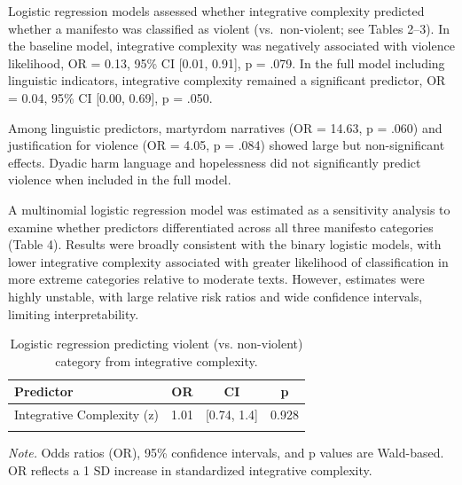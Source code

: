 \documentclass[
  english,
  man,floatsintext]{apa6}
\begin{document}
Logistic regression models assessed whether integrative complexity predicted whether a manifesto was classified as violent (vs.~non-violent; see Tables 2--3). In the baseline model, integrative complexity was negatively associated with violence likelihood, OR = 0.13, 95\% CI {[}0.01, 0.91{]}, p = .079. In the full model including linguistic indicators, integrative complexity remained a significant predictor, OR = 0.04, 95\% CI {[}0.00, 0.69{]}, p = .050.

Among linguistic predictors, martyrdom narratives (OR = 14.63, p = .060) and justification for violence (OR = 4.05, p = .084) showed large but non-significant effects. Dyadic harm language and hopelessness did not significantly predict violence when included in the full model.

A multinomial logistic regression model was estimated as a sensitivity analysis to examine whether predictors differentiated across all three manifesto categories (Table 4). Results were broadly consistent with the binary logistic models, with lower integrative complexity associated with greater likelihood of classification in more extreme categories relative to moderate texts. However, estimates were highly unstable, with large relative risk ratios and wide confidence intervals, limiting interpretability.

\begin{table}[tbp]

\begin{center}
\begin{threeparttable}

\caption{\label{tab:violent-logistic-models}Logistic regression predicting violent (vs. non-violent) category from integrative complexity.}

\begin{tabular}{llll}
\toprule
Predictor & \multicolumn{1}{c}{OR} & \multicolumn{1}{c}{CI} & \multicolumn{1}{c}{p}\\
\midrule
Integrative Complexity (z) & 1.01 & {}[0.74, 1.4] & 0.928\\
\bottomrule
\addlinespace
\end{tabular}

\begin{tablenotes}[para]
\normalsize{\textit{Note.} Odds ratios (OR), 95\% confidence intervals, and p values are Wald-based. OR reflects a 1 SD increase in standardized integrative complexity.}
\end{tablenotes}

\end{threeparttable}
\end{center}

\end{table}
\end{document}
